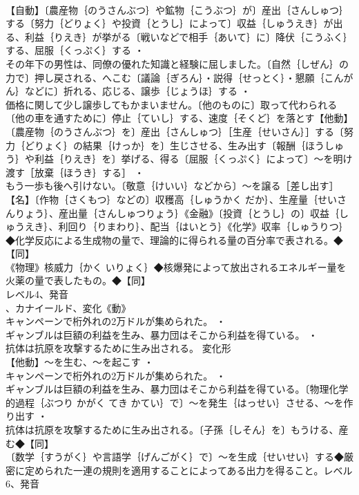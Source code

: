 \documentclass[8pt]{extreport}
\begin{document}
\begin{CJK}{UTF8}{min}
\\	【自動】〔農産物｛のうさんぶつ｝や鉱物｛こうぶつ｝が〕産出｛さんしゅつ｝する〔努力｛どりょく｝や投資｛とうし｝によって〕収益｛しゅうえき｝が出る、利益｛りえき｝が挙がる〔戦いなどで相手｛あいて｝に〕降伏｛こうふく｝する、屈服｛くっぷく｝する ・
\\	その年下の男性は、同僚の優れた知識と経験に屈しました。〔自然｛しぜん｝の力で〕押し戻される、へこむ〔議論｛ぎろん｝・説得｛せっとく｝・懇願｛こんがん｝などに〕折れる、応じる、譲歩｛じょうほ｝する ・
\\	価格に関して少し譲歩してもかまいません。〔他のものに〕取って代わられる〔他の車を通すために〕停止｛ていし｝する、速度｛そくど｝を落とす【他動】〔農産物｛のうさんぶつ｝を〕産出｛さんしゅつ｝［生産｛せいさん｝］する〔努力｛どりょく｝の結果｛けっか｝を〕生じさせる、生み出す〔報酬｛ほうしゅう｝や利益｛りえき｝を〕挙げる、得る〔屈服｛くっぷく｝によって〕～を明け渡す［放棄｛ほうき｝する］ ・
\\	もう一歩も後へ引けない。〔敬意｛けいい｝などから〕～を譲る［差し出す］【名】〔作物｛さくもつ｝などの〕収穫高｛しゅうかく だか｝、生産量｛せいさんりょう｝、産出量｛さんしゅつりょう｝《金融》〔投資｛とうし｝の〕収益｛しゅうえき｝、利回り｛りまわり｝、配当｛はいとう｝《化学》収率｛しゅうりつ｝◆化学反応による生成物の量で、理論的に得られる量の百分率で表される。◆【同】
\\	《物理》核威力｛かく いりょく｝◆核爆発によって放出されるエネルギー量を
\\	火薬の量で表したもの。◆【同】
\\	レベル4、発音
\\	、カナイールド、変化《動》
\\	キャンペーンで桁外れの2万ドルが集められた。 ・
\\	ギャンブルは巨額の利益を生み、暴力団はそこから利益を得ている。 ・
\\	抗体は抗原を攻撃するために生み出される。	変化形 
\\	【他動】～を生む、～を起こす ・
\\	キャンペーンで桁外れの2万ドルが集められた。 ・
\\	ギャンブルは巨額の利益を生み、暴力団はそこから利益を得ている。〔物理化学的過程｛ぶつり かがく てき かてい｝で〕～を発生｛はっせい｝させる、～を作り出す ・
\\	抗体は抗原を攻撃するために生み出される。〔子孫｛しそん｝を〕もうける、産む◆【同】
\\	〔数学｛すうがく｝や言語学｛げんごがく｝で〕～を生成｛せいせい｝する◆厳密に定められた一連の規則を適用することによってある出力を得ること。レベル6、発音

\end{CJK}
\end{document}
